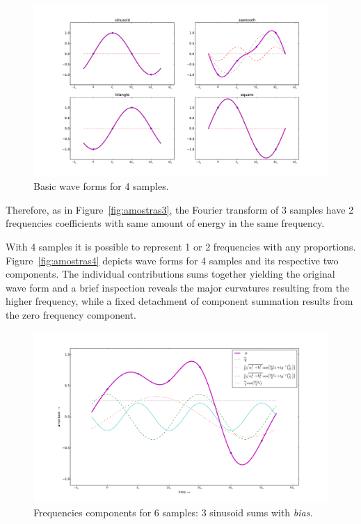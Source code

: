 \documentclass[
 aip,
 jmp,
 amsmath,amssymb,
 reprint,
]{revtex4-1}
\begin{document}
\begin{figure}[h!]
    \centering
        \includegraphics[width=\columnwidth]{figures/amostras4formas__}
    \caption{Basic wave forms for 4 samples.}
        \label{fig:formas4}
\end{figure}

Therefore, as in Figure~\ref{fig:amostras3}, the Fourier transform of 3 samples have 2 frequencies coefficients with same amount of energy in the same frequency.

With 4 samples it is possible to represent 1 or 2 frequencies with any proportions. Figure~\ref{fig:amostras4} depicts wave forms for 4 samples and its respective two components. The individual contributions sums together yielding the original wave form and a brief inspection reveals the major curvatures resulting from the higher frequency, while a fixed detachment of component summation results from the zero frequency component.

\begin{figure}[h!]
    \centering
        \includegraphics[width=\columnwidth]{figures/amostras6}
    \caption{Frequencies components for 6 samples: 3 sinusoid sums with \emph{bias}.}
        \label{fig:amostras6}
\end{figure}
\end{document}
